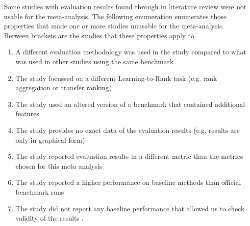 \documentclass{sig-alternate-2013}
\begin{document}
Some studies with evaluation results found through in literature review were not usable for the meta-analysis. The following enumeration enumerates those properties that made one or more studies unusable for the meta-analysis. Between brackets are the studies that these properties apply to.

\begin{enumerate}
\item A different evaluation methodology was used in the study compared to what was used in other studies using the same benchmark \cite{Geng2011, Lin2012}
\item The study focussed on a different Learning-to-Rank task (e.g. rank aggregation or transfer ranking) \cite{De2011, De2010, Derhami2013, De2012, Chen2010, Ah-Pine2008, Wang2009c, De2013, Miao2013, Hoi2008, De2012b, Duh2011b, Argentini2012, Qin2010c, Volkovs2013, Desarkar2011, Pan2013, Lin2011b, Volkovs2012, Dammak2011}
\item The study used an altered version of a benchmark that contained additional features \cite{Bidoki2009, Ding2010}
\item The study provides no exact data of the evaluation results (e.g. results are only in graphical form) \cite{Wang2008, Wang2010, Xu2010, Kuo2009, Li2008, Xia2008, Zhou2011, Wu2011, Zhu2009, Karimzadehgan2011, Swersky2012, Pan2011, Ni2008, Ciaramita2008, Stewart2012, Petterson2009, Agarwal2010, Chang2009, Qin2008c, Adams2011, Sculley2009, Huang2008, Alejo2010, Sun2011, He2010b, Benbouzid2012, Geng2012, Chen2012, Xu2012, Shivaswamy2011}
\item The study reported evaluation results in a different metric than the metrics chosen for this meta-analysis \cite{Yu2009, Thuy2009, Pahikkala2009, Kersting2009, Mohan2011}
\item The study reported a higher performance on baseline methods than official benchmark runs \cite{Dubey2009, Banerjee2009, Peng2010b, Song2014, Bian2010, Bian2010b, Carvalho2008, Acharyya2012, Peng2010b, Tran2012, Asadi2013c}
\item The study did not report any baseline performance that allowed us to check validity of the results \cite{Chakrabarti2008, Wang2012b, Buffoni2011}.
\end{enumerate}
\end{document}
